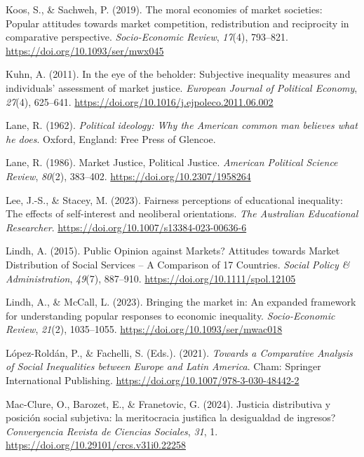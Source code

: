 \documentclass[
  12pt,
]{article}
\newlength{\cslhangindent}
\newenvironment{CSLReferences}[2] %
 {\begin{list}{}{%
  \setlength{\itemindent}{0pt}
  \setlength{\leftmargin}{0pt}
  \setlength{\parsep}{0pt}
  \ifodd #1
   \setlength{\leftmargin}{\cslhangindent}
   \setlength{\itemindent}{-1\cslhangindent}
  \fi
  \setlength{\itemsep}{#2\baselineskip}}}
 {\end{list}}
\begin{document}
\begin{CSLReferences}{1}{0}
Koos, S., \& Sachweh, P. (2019). The moral economies of market
societies: Popular attitudes towards market competition, redistribution
and reciprocity in comparative perspective. \emph{Socio-Economic
Review}, \emph{17}(4), 793--821.
\url{https://doi.org/10.1093/ser/mwx045}

Kuhn, A. (2011). In the eye of the beholder: {Subjective} inequality
measures and individuals' assessment of market justice. \emph{European
Journal of Political Economy}, \emph{27}(4), 625--641.
\url{https://doi.org/10.1016/j.ejpoleco.2011.06.002}

Lane, R. (1962). \emph{Political ideology: Why the {American} common man
believes what he does}. Oxford, England: Free Press of Glencoe.

Lane, R. (1986). Market {Justice}, {Political Justice}. \emph{American
Political Science Review}, \emph{80}(2), 383--402.
\url{https://doi.org/10.2307/1958264}

Lee, J.-S., \& Stacey, M. (2023). Fairness perceptions of educational
inequality: The effects of self-interest and neoliberal orientations.
\emph{The Australian Educational Researcher}.
\url{https://doi.org/10.1007/s13384-023-00636-6}

Lindh, A. (2015). Public {Opinion} against {Markets}? {Attitudes}
towards {Market Distribution} of {Social Services} -- {A Comparison} of
17 {Countries}. \emph{Social Policy \& Administration}, \emph{49}(7),
887--910. \url{https://doi.org/10.1111/spol.12105}

Lindh, A., \& McCall, L. (2023). Bringing the market in: An expanded
framework for understanding popular responses to economic inequality.
\emph{Socio-Economic Review}, \emph{21}(2), 1035--1055.
\url{https://doi.org/10.1093/ser/mwac018}

López-Roldán, P., \& Fachelli, S. (Eds.). (2021). \emph{Towards a
{Comparative Analysis} of {Social Inequalities} between {Europe} and
{Latin America}}. Cham: Springer International Publishing.
\url{https://doi.org/10.1007/978-3-030-48442-2}

Mac-Clure, O., Barozet, E., \& Franetovic, G. (2024). {Justicia
distributiva y posici{ó}n social subjetiva: {\textquestiondown}la
meritocracia justifica la desigualdad de ingresos?} \emph{Convergencia
Revista de Ciencias Sociales}, \emph{31}, 1.
\url{https://doi.org/10.29101/crcs.v31i0.22258}


\end{CSLReferences}
\end{document}

